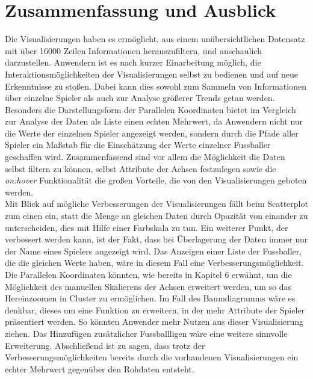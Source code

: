 \documentclass[usegeometry=true]{scrartcl}
\begin{document}
\section{Zusammenfassung und Ausblick}
Die Visualisierungen haben es ermöglicht, aus einem unübersichtlichen Datensatz mit über 16000 Zeilen Informationen herauszufiltern, und anschaulich darzustellen.
Anwendern ist es nach kurzer Einarbeitung möglich, die Interaktionsmöglichkeiten der Visualisierungen selbst zu bedienen und auf neue Erkenntnisse zu stoßen. Dabei kann dies sowohl zum Sammeln von Informationen über einzelne Spieler als auch zur Analyse größerer Trends getan werden. Besonders die Darstellungsform der Parallelen Koordinaten bietet im Vergleich zur Analyse der Daten als Liste einen echten Mehrwert, da Anwendern nicht nur die Werte der einzelnen Spieler angezeigt werden, sondern durch die Pfade aller Spieler ein Maßstab für die Einschätzung der Werte einzelner Fussballer geschaffen wird. Zusammenfassend sind vor allem die Möglichkeit die Daten selbst filtern zu können, selbst Attribute der Achsen festzulegen sowie die \textit{on:hover} Funktionalität die großen Vorteile, die von den Visualisierungen geboten werden.\\
Mit Blick auf mögliche Verbesserungen der Visualisierungen fällt beim Scatterplot zum einen ein, statt die Menge an gleichen Daten durch Opazität von einander zu unterscheiden, dies mit Hilfe einer Farbskala zu tun. Ein weiterer Punkt, der verbessert werden kann, ist der Fakt, dass bei Überlagerung der Daten immer nur der Name eines Spielers angezeigt wird. Das Anzeigen einer Liste der Fussballer, die die gleichen Werte haben, wäre in diesem Fall eine Verbesserungsmöglichkeit.\\
Die Parallelen Koordinaten könnten, wie bereits in Kapitel 6 erwähnt, um die Möglichkeit des manuellen Skalierens der Achsen erweitert werden, um so das Hereinzoomen in Cluster zu ermöglichen.
Im Fall des Baumdiagramms wäre es denkbar, dieses um eine Funktion zu erweitern, in der mehr Attribute der Spieler präsentiert werden. So könnten Anwender mehr Nutzen aus dieser Visualisierung ziehen. Das Hinzufügen zusätzlicher Fussballligen wäre eine weitere sinnvolle Erweiterung. 
Abschließend ist zu sagen, dass trotz der Verbesserungsmöglichkeiten bereits durch die vorhandenen Visualisierungen ein echter Mehrwert gegenüber den Rohdaten entsteht.
\end{document}
